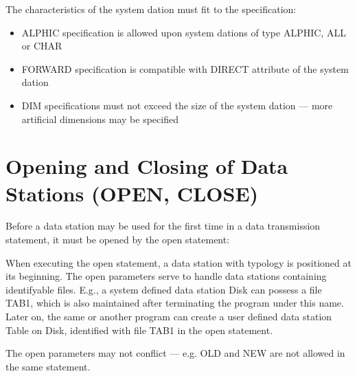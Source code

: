 The characteristics of the system dation must fit to the specification:
\begin{itemize}
\item ALPHIC specification is allowed upon system dations of type ALPHIC,
   ALL or CHAR
\item FORWARD specification is compatible with DIRECT attribute
   of the system dation
\item DIM specifications must not exceed the size of the system dation ---
      more artificial dimensions may be specified
\end{itemize}

\section{Opening and Closing of Data Stations (OPEN, CLOSE)}   %
\label{sec_dation_open_close}

Before a data station may be used for the first time in a data
transmission statement, it must be opened by the open statement:



When executing the open statement, a data station with typology is
positioned at its beginning.
The open parameters serve to handle data stations containing
identifyable files. E.g., a system defined data station Disk can possess
a file TAB1, which is also maintained after terminating the program
under this name. Later on, the same or another program can create a user
defined data station Table on Disk, identified with file TAB1 in the
open statement.





The open parameters may not conflict --- e.g. OLD and NEW are not allowed
in the same statement.

